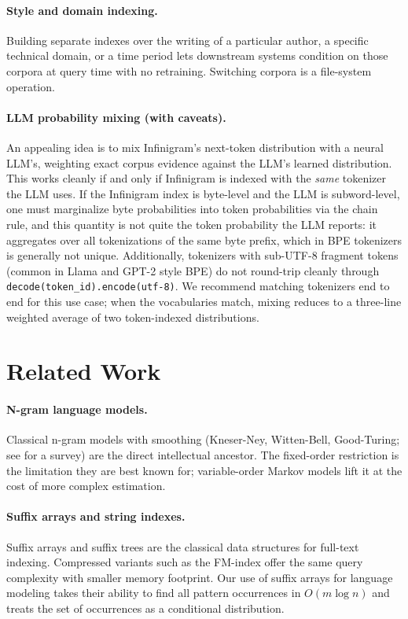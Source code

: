 \documentclass[11pt]{article}
\begin{document}
\paragraph{Style and domain indexing.}
Building separate indexes over the writing of a particular author, a specific technical domain, or a time period lets downstream systems condition on those corpora at query time with no retraining. Switching corpora is a file-system operation.

\paragraph{LLM probability mixing (with caveats).}
An appealing idea is to mix Infinigram's next-token distribution with a neural LLM's, weighting exact corpus evidence against the LLM's learned distribution. This works cleanly if and only if Infinigram is indexed with the \emph{same} tokenizer the LLM uses. If the Infinigram index is byte-level and the LLM is subword-level, one must marginalize byte probabilities into token probabilities via the chain rule, and this quantity is not quite the token probability the LLM reports: it aggregates over all tokenizations of the same byte prefix, which in BPE tokenizers is generally not unique. Additionally, tokenizers with sub-UTF-8 fragment tokens (common in Llama and GPT-2 style BPE) do not round-trip cleanly through \texttt{decode(token\_id).encode(utf-8)}. We recommend matching tokenizers end to end for this use case; when the vocabularies match, mixing reduces to a three-line weighted average of two token-indexed distributions.

\section{Related Work}

\paragraph{N-gram language models.}
Classical n-gram models with smoothing (Kneser-Ney, Witten-Bell, Good-Turing; see \citet{chen1996empirical} for a survey) are the direct intellectual ancestor. The fixed-order restriction is the limitation they are best known for; variable-order Markov models \citep{rissanen1983,begleiter2004prediction} lift it at the cost of more complex estimation.

\paragraph{Suffix arrays and string indexes.}
Suffix arrays \citep{manber1993suffix} and suffix trees \citep{weiner1973,mccreight1976} are the classical data structures for full-text indexing. Compressed variants such as the FM-index \citep{ferragina2000,ferragina2005} offer the same query complexity with smaller memory footprint. Our use of suffix arrays for language modeling takes their ability to find all pattern occurrences in $O(m \log n)$ and treats the set of occurrences as a conditional distribution.
\end{document}
